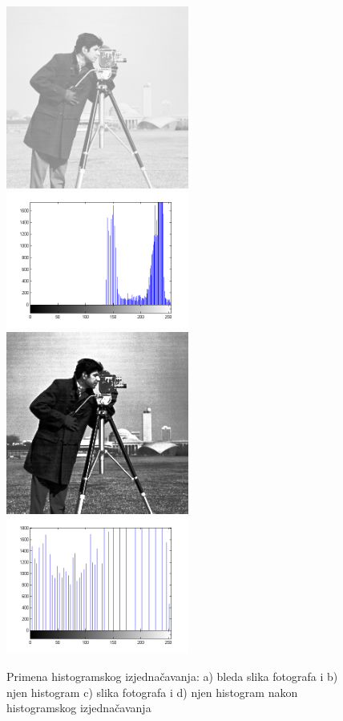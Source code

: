 \documentclass[a4paper,12pt,titlepage]{article}
\begin{document}
\begin{figure}[ht!]
\centering
\includegraphics[width=60mm]{img/imgPow2.png}
\includegraphics[width=60mm]{img/histImgPow2.png}
\includegraphics[width=60mm]{img/histEq.png}
\includegraphics[width=60mm]{img/histEqhist.png}
\caption{Primena histogramskog izjednačavanja: a) bleda slika fotografa i b) njen histogram c) slika fotografa i d) njen histogram nakon histogramskog izjednačavanja}
\label{overflow}
\end{figure}
\end{document}
